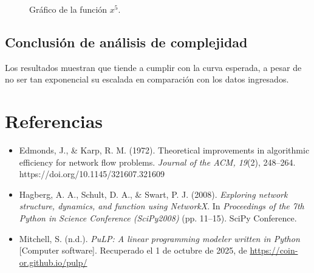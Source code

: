 \documentclass[a4paper, 12pt]{article}
\begin{document}
\begin{figure}[h!]
    \centering
    \caption{Gráfico de la función \(x^5\).}
\end{figure}
\subsection{Conclusión de análisis de complejidad}
\text Los resultados muestran que tiende a cumplir con la curva esperada, a pesar de no ser tan exponencial su escalada en comparación con los datos ingresados.

\section{Referencias}
\begin{itemize}

\item Edmonds, J., \& Karp, R. M. (1972). Theoretical improvements in algorithmic efficiency for network flow problems. \textit{Journal of the ACM, 19}(2), 248–264. https://doi.org/10.1145/321607.321609
\item Hagberg, A. A., Schult, D. A., \& Swart, P. J. (2008). \textit{Exploring network structure, dynamics, and function using NetworkX}. In \textit{Proceedings of the 7th Python in Science Conference (SciPy2008)} (pp. 11–15). SciPy Conference.
\item Mitchell, S. (n.d.). \textit{PuLP: A linear programming modeler written in Python} [Computer software]. Recuperado el 1 de octubre de 2025, de \url{https://coin-or.github.io/pulp/}
\end{itemize}
\end{document}
